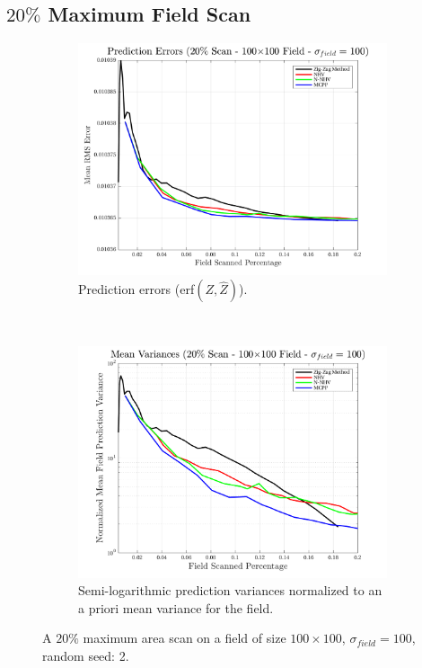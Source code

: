 \FloatBarrier
\clearpage
\subsection{$20\%$ Maximum Field Scan}
\begin{figure}[htb!]
    \centering
    \begin{subfigure}[t]{0.65\textwidth}
        \centering
        \includegraphics[width=\linewidth]{figures/hbresults/pred_errs_20p_100x100_sf_100_seed_2.png}
        \captionsetup{skip=0.20\baselineskip,size=footnotesize}
        \caption{Prediction errors (erf$(Z,\hat{Z})$).}
        \label{fig:prederrs_sigma100_p20_s2}
    \end{subfigure}%
    \\
    \begin{subfigure}[t]{0.65\textwidth}
        \centering
        \includegraphics[width=\linewidth]{figures/hbresults/vars_20p_100x100_sf_100_seed_2.png}
        \captionsetup{skip=0.20\baselineskip,size=footnotesize}
        \caption{Semi-logarithmic prediction variances normalized to an a priori mean variance for the field.}
        \label{fig:prederrs_sigma100_p20_s2}
    \end{subfigure}
    \captionsetup{skip=0.20\baselineskip}
    \caption{A $20\%$ maximum area scan on a field of size $100 \times 100$, $\sigma_{field} = 100$, random seed: 2.}
    \label{fig:sigma100_p20_s2}
\end{figure}

